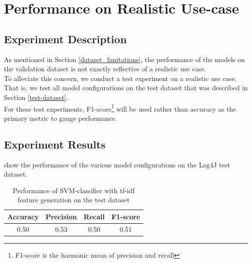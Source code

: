 \section{Performance on Realistic Use-case}

\subsection{Experiment Description}

As mentioned in Section \ref{dataset_limitations}, the performance of the models on the validation dataset is not exactly reflective of a realistic use case.\\

\noindent
To alleviate this concern, we conduct a test experiment on a realistic use case. That is, we test all model configurations on the test dataset that was described in Section \ref{test-dataset}. \\


\noindent
For these test experiments, F1-score\footnote{F1-score is the harmonic mean of precision and recall} will be used rather than accuracy as the primary metric to gauge performance.

\subsection{Experiment Results}
\label{experiment_results}

\noindent
{} show the performance of the various model configurations on the Log4J test dataset. \\

\begin{table}[H]
\caption{Performance of SVM-classifier with tf-idf feature generation on the test dataset}
\label{tab:test_perfomance_tfidf_svm}
    \begin{center}
        \begin{tabular}{c|c|c|c}
            \textbf{Accuracy} & \textbf{Precision} & \textbf{Recall} & \textbf{F1-score}  \\
            \hline
            0.50 & 0.53 & 0.50 & 0.51\\
        \end{tabular}
    \end{center}
\end{table}

